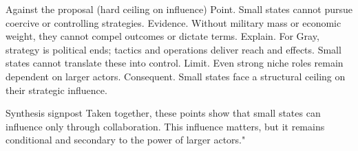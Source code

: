 Against the proposal (hard ceiling on influence)
Point. Small states cannot pursue coercive or controlling strategies.
Evidence. Without military mass or economic weight, they cannot compel outcomes or dictate terms.
Explain. For Gray, strategy is political ends; tactics and operations deliver reach and effects. Small states cannot translate these into control.
Limit. Even strong niche roles remain dependent on larger actors.
Consequent. Small states face a structural ceiling on their strategic influence.

Synthesis signpost
Taken together, these points show that small states can influence only through collaboration. This influence matters, but it remains conditional and secondary to the power of larger actors."